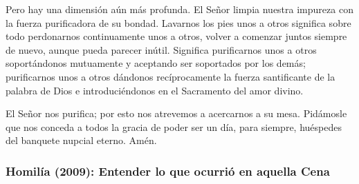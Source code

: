 \begin{body}
Pero hay una dimensión aún más profunda. El Señor limpia nuestra impureza con la fuerza purificadora de su bondad. Lavarnos los pies unos a otros significa sobre todo perdonarnos continuamente unos a otros, volver a comenzar juntos siempre de nuevo, aunque pueda parecer inútil. Significa purificarnos unos a otros soportándonos mutuamente y aceptando ser soportados por los demás; purificarnos unos a otros dándonos recíprocamente la fuerza santificante de la palabra de Dios e introduciéndonos en el Sacramento del amor divino.

El Señor nos purifica; por esto nos atrevemos a acercarnos a su mesa. Pidámosle que nos conceda a todos la gracia de poder ser un día, para siempre, huéspedes del banquete nupcial eterno. Amén.
\end{body}


\subsubsection{Homilía (2009): Entender lo que ocurrió en aquella Cena}


